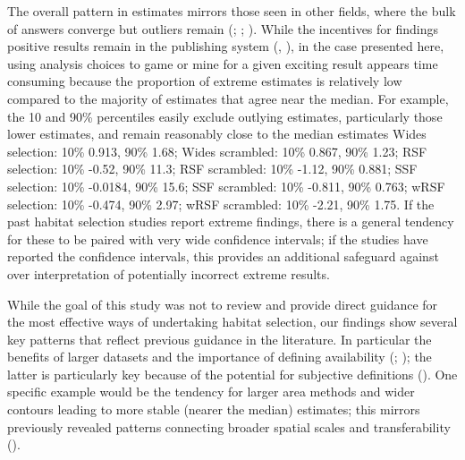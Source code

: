 \documentclass[10pt,a4paper]{article}
\begin{document}
The overall pattern in estimates mirrors those seen in other fields, where the bulk of answers converge but outliers remain (; ; ).
While the incentives for findings positive results remain in the publishing system (, ), in the case presented here, using analysis choices to game or mine for a given exciting result appears time consuming because the proportion of extreme estimates is relatively low compared to the majority of estimates that agree near the median.
For example, the 10 and 90\% percentiles easily exclude outlying estimates, particularly those lower estimates, and remain reasonably close to the median estimates Wides selection: 10\% 0.913, 90\% 1.68; Wides scrambled: 10\% 0.867, 90\% 1.23; RSF selection: 10\% -0.52, 90\% 11.3; RSF scrambled: 10\% -1.12, 90\% 0.881; SSF selection: 10\% -0.0184, 90\% 15.6; SSF scrambled: 10\% -0.811, 90\% 0.763; wRSF selection: 10\% -0.474, 90\% 2.97; wRSF scrambled: 10\% -2.21, 90\% 1.75.
If the past habitat selection studies report extreme findings, there is a general tendency for these to be paired with very wide confidence intervals; if the studies have reported the confidence intervals, this provides an additional safeguard against over interpretation of potentially incorrect extreme results.

While the goal of this study was not to review and provide direct guidance for the most effective ways of undertaking habitat selection, our findings show several key patterns that reflect previous guidance in the literature.
In particular the benefits of larger datasets and the importance of defining availability (; ); the latter is particularly key because of the potential for subjective definitions ().
One specific example would be the tendency for larger area methods and wider contours leading to more stable (nearer the median) estimates; this mirrors previously revealed patterns connecting broader spatial scales and transferability ().
\end{document}

